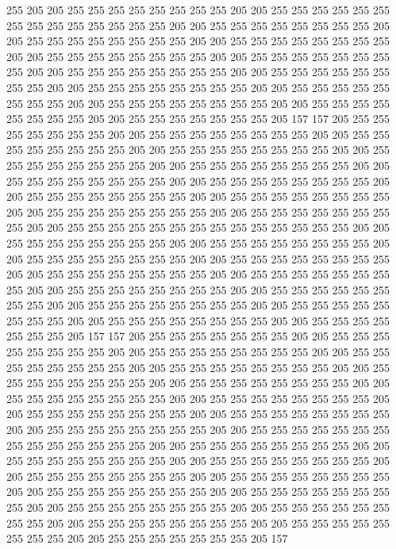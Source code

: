 255 205 205 255 255 255 255 255 255 255 255 205 205 255 255 255 255 255 255 255
255 255 255 255 255 255 255 205 205 255 255 255 255 255 255 255 255 205 205 255
255 255 255 255 255 255 255 205 205 255 255 255 255 255 255 255 255 205 205 255
255 255 255 255 255 255 255 205 205 255 255 255 255 255 255 255 255 205 205 255
255 255 255 255 255 255 255 205 205 255 255 255 255 255 255 255 255 205 205 255
255 255 255 255 255 255 255 205 205 255 255 255 255 255 255 255 255 205 205 255
255 255 255 255 255 255 255 205 205 255 255 255 255 255 255 255 255 205 205 255
255 255 255 255 255 255 205 157 157 205 255 255 255 255 255 255 255 205 205 255
255 255 255 255 255 255 255 205 205 255 255 255 255 255 255 255 255 205 205 255
255 255 255 255 255 255 255 205 205 255 255 255 255 255 255 255 255 205 205 255
255 255 255 255 255 255 255 205 205 255 255 255 255 255 255 255 255 205 205 255
255 255 255 255 255 255 255 205 205 255 255 255 255 255 255 255 255 205 205 255
255 255 255 255 255 255 255 205 205 255 255 255 255 255 255 255 255 205 205 255
255 255 255 255 255 255 255 205 205 255 255 255 255 255 255 255 255 255 255 255
255 255 255 205 205 255 255 255 255 255 255 255 255 205 205 255 255 255 255 255
255 255 255 205 205 255 255 255 255 255 255 255 255 205 205 255 255 255 255 255
255 255 255 205 205 255 255 255 255 255 255 255 255 205 205 255 255 255 255 255
255 255 255 205 205 255 255 255 255 255 255 255 255 205 205 255 255 255 255 255
255 255 255 205 205 255 255 255 255 255 255 255 255 205 205 255 255 255 255 255
255 255 255 205 205 255 255 255 255 255 255 255 255 205 205 255 255 255 255 255
255 255 205 157 157 205 255 255 255 255 255 255 255 205 205 255 255 255 255 255
255 255 255 205 205 255 255 255 255 255 255 255 255 205 205 255 255 255 255 255
255 255 255 205 205 255 255 255 255 255 255 255 255 205 205 255 255 255 255 255
255 255 255 205 205 255 255 255 255 255 255 255 255 205 205 255 255 255 255 255
255 255 255 205 205 255 255 255 255 255 255 255 255 205 205 255 255 255 255 255
255 255 255 205 205 255 255 255 255 255 255 255 255 205 205 255 255 255 255 255
255 255 255 205 205 255 255 255 255 255 255 255 255 255 255 255 255 255 255 205
205 255 255 255 255 255 255 255 255 205 205 255 255 255 255 255 255 255 255 205
205 255 255 255 255 255 255 255 255 205 205 255 255 255 255 255 255 255 255 205
205 255 255 255 255 255 255 255 255 205 205 255 255 255 255 255 255 255 255 205
205 255 255 255 255 255 255 255 255 205 205 255 255 255 255 255 255 255 255 205
205 255 255 255 255 255 255 255 255 205 205 255 255 255 255 255 255 255 255 205
205 255 255 255 255 255 255 255 255 205 205 255 255 255 255 255 255 255 205 157

